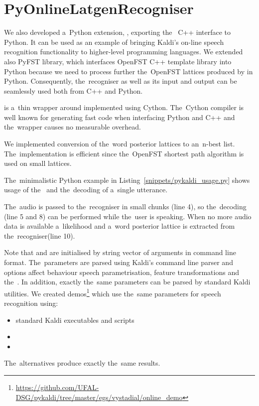 \section{PyOnlineLatgenRecogniser}
\label{sec:pyext}

We also developed a~Python extension, , exporting the~ C++ interface to Python.
It can be used as an example of bringing Kaldi's on-line speech recognition functionality to higher-level programming languages.
We extended also PyFST library\cite{pyfst2014url}, which interfaces OpenFST C++ template library into Python because we need to process further the~OpenFST lattices produced by  in Python.
Consequently, the~recogniser as well as its input and output can be seamlessly used both from C++ and Python.

 is a~thin wrapper around  implemented using Cython\cite{cython2014url}.
The~Cython compiler is well known for generating fast code when interfacing Python and C++ and the~wrapper causes no measurable overhead.

We implemented conversion of the~word posterior lattices to an~n-best list.
The~implementation is efficient since the~OpenFST shortest path algorithm is used on small lattices.

The~minimalistic Python example in Listing~\ref{snippets/pykaldi_usage.py} shows usage of the~ and the~decoding of a~single utterance.

The~audio is passed to the~recogniser in small chunks (line 4), so the~decoding (line 5 and 8) can be performed while the~user is speaking.
When no more audio data is available a~likelihood and a~word posterior lattice is extracted from the~recogniser(line 10).

Note that  and  are initialised by string vector of arguments in command line format.
The~parameters are parsed using Kaldi's command line parser and options affect behaviour speech parametrisation, feature transformations and  the~.
In addition, exactly the~same parameters can be parsed by standard Kaldi utilities. 
We created demos\footnote{\url{https://github.com/UFAL-DSG/pykaldi/tree/master/egs/vystadial/online_demo}} which use the~same parameters for speech recognition using:
\begin{itemize}
    \item standard Kaldi executables and scripts
    \item {} 
    \item {}
\end{itemize}
The~alternatives produce exactly the~same results.

